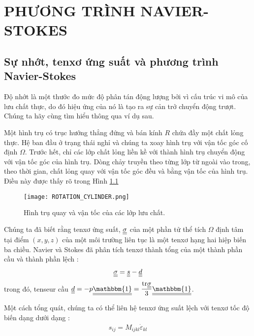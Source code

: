 \documentclass[CO_LUU_CHAT_NANG_CAO.tex]{subfiles}
\begin{document}
\chapter{PHƯƠNG TRÌNH NAVIER-STOKES}
\section{Sự nhớt, tenxơ ứng suất và phương trình Navier-Stokes}
Độ nhớt là một thước đo mức độ phân tán động lượng bởi vì cấu trúc vi mô của lưu chất thực, do đó hiệu ứng của nó là tạo ra sự cản trở chuyển động trượt. Chúng ta hãy cùng tìm hiểu thông qua ví dụ sau.
\begin{exmp}
    Một hình trụ có trục hướng thẳng đứng và bán kính $R$ chứa đầy một chất lỏng thực. Hệ ban đầu ở trạng thái nghỉ và chúng ta xoay hình trụ với vận tốc góc cố định $\Omega$. Trước hết, chỉ các lớp chất lỏng liền kề với thành hình trụ chuyển động với vận tốc góc của hình trụ. Dòng chảy truyền theo từng lớp từ ngoài vào trong, theo thời gian, chất lỏng quay với vận tốc góc đều và bằng vận tốc của hình trụ. Điều này được thấy rõ trong Hình \ref{ROTATION_CYLINDER}
    \begin{figure}[h!]
        \centering
        \texttt{[image: ROTATION\_CYLINDER.png]}
        \caption{Hình trụ quay và vận tốc của các lớp lưu chất.}
        \label{ROTATION_CYLINDER}
    \end{figure}
\end{exmp}

Chúng ta đã biết rằng tenxơ ứng suất, $\underline{\underline{\sigma}}$ của một phần tử thể tích $\Omega$ định tâm tại điểm $(x,y,z)$ của một môi trường liên tục là một tenxơ hạng hai hiệp biến ba chiều. Navier và Stokes đã phân tích tenxơ thành tổng của một thành phần cầu và thành phần lệch :
\begin{equation}
    \begin{aligned}
        \underline{\underline{\sigma}} = \underline{\underline{s}} - \underline{\underline{d}} 
    \end{aligned}
\end{equation}
trong đó, tenseur cầu $\displaystyle\deuxtenseur d = -p\deuxtenseur{\mathbbm{1}} = \frac{\text{tr}\deuxtenseur\sigma}{3}\deuxtenseur{\mathbbm{1}}$.

Một cách tổng quát, chúng ta có thể liên hệ tenxơ ứng suất lệch với tenxơ tốc độ biến dạng dưới dạng :
\begin{equation}
    \begin{aligned}
        {s}_{ij} = M_{ijkl}{\dot{\varepsilon}}_{kl}
    \end{aligned}
\end{equation}
\end{document}
